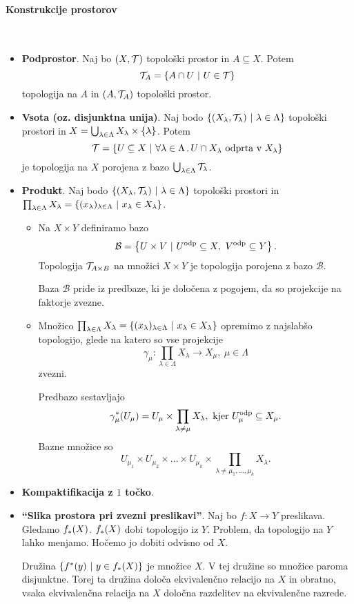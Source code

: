 \paragraph{Konstrukcije prostorov} \
\begin{itemize}
    \item \textbf{Podprostor}. Naj bo \((X, \mathcal{T})\) topološki prostor in \(A \subseteq X\). Potem \[\mathcal{T}_A = \left\{A \cap U \ | \ U \in \mathcal{T}\right\}\]
    topologija na \(A\) in \((A, \mathcal{T}_A)\) topološki prostor.
    \item \textbf{Vsota (oz. disjunktna unija)}. Naj bodo \(\left\{(X_\lambda, \mathcal{T}_\lambda) \ | \ \lambda \in \Lambda\right\}\) topološki prostori in \(X = \bigcup_{\lambda \in \Lambda} X_\lambda \times \left\{\lambda\right\}\). Potem \[\mathcal{T} = \left\{U \subseteq X \ | \ \forall \lambda \in \Lambda \,.\, U \cap X_\lambda \text{ odprta v } X_\lambda\right\}\]
    je topologija na \(X\) porojena z bazo \(\bigcup_{\lambda \in \Lambda} \mathcal{T}_\lambda\).
    \item \textbf{Produkt}. Naj bodo \(\left\{(X_\lambda, \mathcal{T}_\lambda) \ | \ \lambda \in \Lambda\right\}\) topološki prostori in \(\prod_{\lambda \in \Lambda} X_\lambda = \left\{(x_\lambda)_{\lambda \in \Lambda} \ | \ x_\lambda \in X_\lambda\right\}\).
    \begin{itemize}
        \item Na \(X \times Y\) definiramo bazo \[\mathcal{B} = \left\{U \times V \ | \ U^\text{odp} \subseteq X, \ V^\text{odp} \subseteq Y\right\}.\]
        Topologija \(\mathcal{T}_{A \times B}\) na množici \(X \times Y\) je topologija porojena z bazo \(\mathcal{B}\). 
        \begin{opomba}
            Baza \(\mathcal{B}\) pride iz predbaze, ki je določena z pogojem, da so projekcije na faktorje zvezne.
        \end{opomba}
        \item Množico \(\prod_{\lambda \in \Lambda} X_\lambda = \left\{(x_\lambda)_{\lambda \in \Lambda} \ | \ x_\lambda \in X_\lambda\right\}\) opremimo z najslabšo topologijo, glede na katero so vse projekcije \[\gamma_\mu: \prod_{\lambda \in \Lambda} X_\lambda \to X_\mu, \ \mu \in \Lambda\]
        zvezni.

        Predbazo sestavljajo \[\gamma_\mu^{*}(U_\mu) = U_\mu \times \prod_{\lambda \neq \mu} X_\lambda, \ \text{kjer} \ U_\mu^\text{odp} \subseteq X_\mu.\]
        Bazne množice so \[U_{\mu_1} \times U_{\mu_2} \times \ldots \times U_{\mu_k} \times \prod_{\lambda \neq \mu_1, \ldots, \mu_k}X_\lambda.\]        
    \end{itemize}
    \item \textbf{Kompaktifikacija z \(1\) točko}.
    \item \textbf{"`Slika prostora pri zvezni preslikavi"'}. Naj bo \(f: X \to Y\) preslikava. Gledamo \(f_{*}(X)\). \(f_{*}(X)\) dobi topologijo iz \(Y\). Problem, da topologijo na \(Y\) lahko menjamo. Hočemo jo dobiti odvisno od \(X\).
    
    Družina \(\left\{f^{*}(y) \ | \ y \in f_{*}(X)\right\}\) je  množice \(X\). V tej družine so množice paroma disjunktne. Torej ta družina določa ekvivalenčno relacijo na \(X\) in obratno, vsaka ekvivalenčna relacija na \(X\) določna razdelitev na ekvivalenčne razrede.  
\end{itemize}